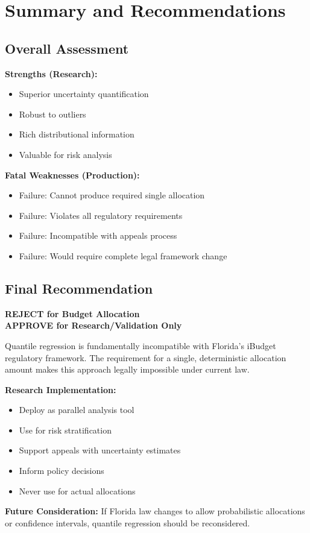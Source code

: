 \section{Summary and Recommendations}

\subsection{Overall Assessment}

\textbf{Strengths (Research):}
\begin{itemize}
    \item Superior uncertainty quantification
    \item Robust to outliers
    \item Rich distributional information
    \item Valuable for risk analysis
\end{itemize}

\textbf{Fatal Weaknesses (Production):}
\begin{itemize}
    \item Failure:  Cannot produce required single allocation
    \item Failure:  Violates all regulatory requirements
    \item Failure:  Incompatible with appeals process
    \item Failure:  Would require complete legal framework change
\end{itemize}

\subsection{Final Recommendation}

\textbf{REJECT for Budget Allocation}\\
\textbf{APPROVE for Research/Validation Only}

Quantile regression is fundamentally incompatible with Florida's iBudget regulatory framework. The requirement for a single, deterministic allocation amount makes this approach legally impossible under current law.

\textbf{Research Implementation:}
\begin{itemize}
    \item Deploy as parallel analysis tool
    \item Use for risk stratification
    \item Support appeals with uncertainty estimates
    \item Inform policy decisions
    \item Never use for actual allocations
\end{itemize}

\textbf{Future Consideration:} If Florida law changes to allow probabilistic allocations or confidence intervals, quantile regression should be reconsidered.
